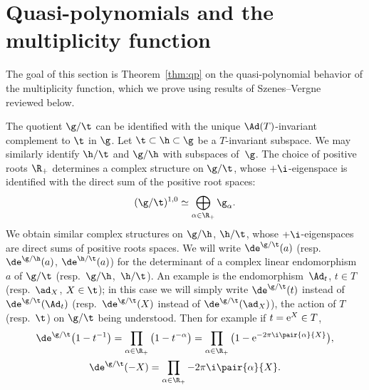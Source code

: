 \section{Quasi-polynomials and the multiplicity function}\label{sec:mult}
The goal of this section is Theorem~\ref{thm:qp} on the quasi-polynomial behavior of the multiplicity function, which we prove using results of Szenes--Vergne~\cite{SzenesVergne2010} reviewed below.

The quotient $\g/\t$ can be identified with the unique $\Ad(T)$-invariant complement to $\t$ in $\g$. Let $\t \subset \h \subset \g$ be a $T$-invariant subspace. We may similarly identify $\h/\t$ and $\g/\h$ with subspaces of~$\g$. The choice of positive roots $\R_+$ determines a complex structure on $\g/\t$, whose $+\i$-eigenspace is identified with the direct sum of the positive root spaces:
\[ (\g/\t)^{1,0}\simeq \bigoplus_{\alpha \in \R_+} \g_\alpha.\]
We obtain similar complex structures on $\g/\h$, $\h/\t$, whose $+\i$-eigenspaces are direct sums of positive roots spaces. We will write $\de^{\g/\t}(a)$ (resp.~$\de^{\g/\h}(a)$, $\de^{\h/\t}(a)$) for the determinant of a complex linear endomorphism $a$ of $\g/\t$ (resp.~$\g/\h$,~$\h/\t$). An example is the endomorphism~$\Ad_t$, $t \in T$ (resp.~$\ad_X$, $X \in \t$); in this case we will simply write $\de^{\g/\t}(t)$ instead of $\de^{\g/\t}(\Ad_t)$ (resp.~$\de^{\g/\t}(X)$ instead of $\de^{\g/\t}(\ad_X)$), the action of $T$ (resp.~$\t$) on $\g/\t$ being understood. Then for example if $t={\rm e}^X \in T$,
\begin{gather*} \de^{\g/\t}\big(1-t^{-1}\big)=\prod_{\alpha \in \R_+}\big(1-t^{-\alpha}\big)=\prod_{\alpha \in \R_+}\big(1-{\rm e}^{-2\pi \i \pair{\alpha}{X}}\big), \\
 \de^{\g/\t}(-X)=\prod_{\alpha \in \R_+} -2\pi \i \pair{\alpha}{X}.\end{gather*}


